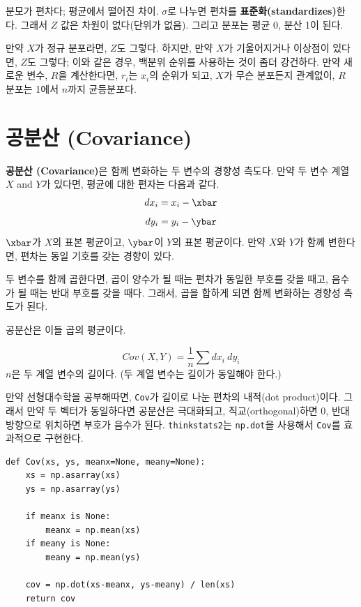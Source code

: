 분모가 편차다; 평균에서 떨어진 차이. $\sigma$로 나누면 편차를 {\bf 표준화(standardizes)}한다. 그래서 $Z$ 값은 차원이 없다(단위가 없음). 그리고 분포는 평균 0, 분산 1이 된다.

만약 $X$가 정규 분포라면, $Z$도 그렇다. 하지만, 만약 $X$가 기울어지거나 이상점이 있다면, $Z$도 그렇다; 이와 같은 경우, 백분위 순위를 사용하는 것이 좀더 강건하다.
만약 새로운 변수, $R$을 계산한다면, $r_i$는 $x_i$의 순위가 되고, $X$가 무슨 분포든지 관계없이, $R$ 분포는 1에서 $n$까지 균등분포다.



\section{공분산 (Covariance)}

{\bf 공분산 (Covariance)}은 함께 변화하는 두 변수의 경향성 측도다.
만약 두 변수 계열 $X$ and $Y$가 있다면,
평균에 대한 편자는 다음과 같다.
%
\[ dx_i = x_i - \xbar \]
\[ dy_i = y_i - \ybar \]
%
$\xbar$가 $X$의 표본 평균이고, 
$\ybar$이 $Y$의 표본 평균이다.
만약 $X$와 $Y$가 함께 변한다면, 편차는 동일 기호를 갖는 경향이 있다.

두 변수를 함께 곱한다면, 곱이 양수가 될 때는 편차가 동일한 부호를 갖을 때고, 음수가 될 때는 반대 부호를 갖을 때다.
그래서, 곱을 합하게 되면 함께 변화하는 경향성 측도가 된다. 

공분산은 이들 곱의 평균이다.

%
\[ Cov(X,Y) = \frac{1}{n} \sum dx_i~dy_i \]
%
$n$은 두 계열 변수의 길이다. (두 계열 변수는 길이가 동일해야 한다.)

만약 선형대수학을 공부해따면, {\tt Cov}가 길이로 나눈 편차의 내적(dot product)이다. 그래서 만약 두 벡터가 동일하다면 공분산은 극대화되고, 직교(orthogonal)하면 0, 반대 방향으로 위치하면 부호가 음수가 된다. {\tt thinkstats2}는 {\tt np.dot}을 사용해서 {\tt Cov}를 효과적으로 구현한다.

\begin{verbatim}
def Cov(xs, ys, meanx=None, meany=None):
    xs = np.asarray(xs)
    ys = np.asarray(ys)

    if meanx is None:
        meanx = np.mean(xs)
    if meany is None:
        meany = np.mean(ys)

    cov = np.dot(xs-meanx, ys-meany) / len(xs)
    return cov
\end{verbatim}


